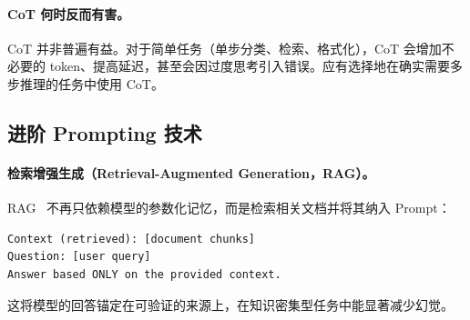 \paragraph{CoT 何时反而有害。}
\label{when-cot-hurts.}

CoT 并非普遍有益。对于简单任务（单步分类、检索、格式化），CoT 会增加不必要的 token、提高延迟，甚至会因过度思考引入错误。应有选择地在确实需要多步推理的任务中使用 CoT。

\subsection{进阶 Prompting 技术}
\label{advanced-prompting-techniques}

\paragraph{检索增强生成（Retrieval-Augmented Generation，RAG）。}
\label{retrieval-augmented-generation-rag.}

RAG~\cite{lewis2020retrieval} 不再只依赖模型的参数化记忆，而是检索相关文档并将其纳入 Prompt：

\begin{lstlisting}
Context (retrieved): [document chunks]
Question: [user query]
Answer based ONLY on the provided context.
\end{lstlisting}

这将模型的回答锚定在可验证的来源上，在知识密集型任务中能显著减少幻觉。

